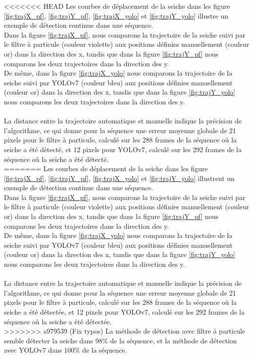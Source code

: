<<<<<<< HEAD
Les courbes de déplacement de la seiche dans les figure \ref{fig:trajX_pf}, \ref{fig:trajY_pf}, \ref{fig:trajX_yolo} et \ref{fig:trajY_yolo} illustre un exemple de détection continue dans une séquence.\\
Dans la figure \ref{fig:trajX_pf}, nous comparons la trajectoire de la seiche suivi par le filtre à particule (couleur violette) aux positions définies manuellement (couleur or) dans la direction des x, tandis que dans la figure \ref{fig:trajY_pf} nous comparons les deux trajectoires dans la direction des y.\\
De même, dans la figure \ref{fig:trajX_yolo} nous comparons la trajectoire de la seiche suivi par YOLOv7 (couleur bleu) aux positions définies manuellement (couleur or) dans la direction des x, tandis que dans la figure \ref{fig:trajY_yolo} nous comparons les deux trajectoires dans la direction des y.\\
\\
La distance entre la trajectoire automatique et manuelle indique la précision de l'algorithme, ce qui donne pour la séquence une erreur moyenne globale de 21 pixels pour le filtre à particule, calculé sur les 288 frames de la séquence où la seiche a été détecté, et 12 pixels pour YOLOv7, calculé sur les 292 frames de la séquence où la seiche a été détecté.\\
=======
Les courbes de déplacement de la seiche dans les figure \ref{fig:trajX_pf}, \ref{fig:trajY_pf}, \ref{fig:trajX_yolo} et \ref{fig:trajY_yolo} illustrent un exemple de détection continue dans une séquence.\\
Dans la figure \ref{fig:trajX_pf}, nous comparons la trajectoire de la seiche suivi par le filtre à particule (couleur violette) aux positions définies manuellement (couleur or) dans la direction des x, tandis que dans la figure \ref{fig:trajY_pf} nous comparons les deux trajectoires dans la direction des y.\\
De même, dans la figure \ref{fig:trajX_yolo} nous comparons la trajectoire de la seiche suivi par YOLOv7 (couleur bleu) aux positions définies manuellement (couleur or) dans la direction des x, tandis que dans la figure \ref{fig:trajY_yolo} nous comparons les deux trajectoires dans la direction des y.\\
\\
La distance entre la trajectoire automatique et manuelle indique la précision de l'algorithme, ce qui donne pour la séquence une erreur moyenne globale de 21 pixels pour le filtre à particule, calculé sur les 288 frames de la séquence où la seiche a été détectée, et 12 pixels pour YOLOv7, calculé sur les 292 frames de la séquence où la seiche a été détectée.\\
>>>>>>> a979539 (Fix typos)
La méthode de détection avec filtre à particule semble détecter la seiche dans 98\% de la séquence, et la méthode de détection avec YOLOv7 dans 100\% de la séquence.

